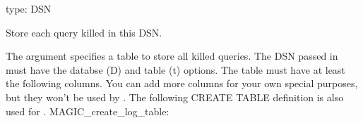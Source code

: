 \documentclass[letterpaper,10pt,english]{sphinxmanual}
\begin{document}

\begin{fulllineitems}
\label{\detokenize{mariadb-kill:cmdoption-mariadb-kill-log-dsn}}
type: DSN

Store each query killed in this DSN.

The argument specifies a table to store all killed queries.  The DSN
passed in must have the databse (D) and table (t) options. The
table must have at least the following columns.  You can add more columns for
your own special purposes, but they won’t be used by .  The
following CREATE TABLE definition is also used for {\hyperref[\detokenize{mariadb-kill:cmdoption-mariadb-kill-create-log-table}]{}}.
MAGIC\_create\_log\_table:


\end{fulllineitems}
\end{document}
